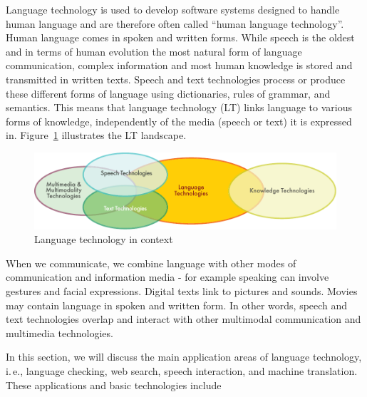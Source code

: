 \documentclass[]{../../metanetpaper}
\begin{document}
\clearpage


\begin{multicols}{2}

Language technology is used to develop software systems designed to handle
human language and are therefore often called “human language
technology”. Human language comes in spoken and written forms. While speech is
the oldest and in terms of human evolution the most natural form of language
communication, complex information and most human knowledge is stored and
transmitted in written texts. Speech and text technologies process or produce
these different forms of language using dictionaries, rules of grammar, and
semantics. This means that language technology (LT) links language to various
forms of knowledge, independently of the media (speech or text) it is
expressed in. Figure~\ref{fig:ltincontext_en} illustrates the LT landscape. 


\begin{figure}[htb]
  \center
  \includegraphics[width=\textwidth]{../_media/english/language_technologies}
  \caption{Language technology in context}
  \label{fig:ltincontext_en}
\end{figure}



When we communicate, we combine language with other modes of communication and
information media - for example speaking can involve gestures and facial
expressions. Digital texts link to pictures and sounds. Movies may contain
language in spoken and written form. In other words, speech and text
technologies overlap and interact with other multimodal communication and
multimedia technologies.

In this section, we will discuss the main application areas of language
technology, i.\,e., language checking, web search, speech interaction, and
machine translation. These applications and basic technologies include 



\end{multicols}
\end{document}
